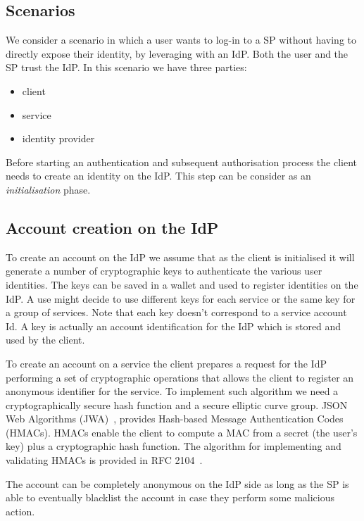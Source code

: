 \subsection{Scenarios}

We consider a scenario in which a user wants to log-in to a SP without having to directly expose their identity, by leveraging with an IdP. Both the user and the SP trust the IdP. In this scenario we have three parties:
\begin{itemize}
    \item client
    \item service
    \item identity provider
\end{itemize}

Before starting an authentication and subsequent authorisation process the client needs to create an identity on the IdP. This step can be consider as an \emph{initialisation} phase.

\subsection{Account creation on the IdP}

To create an account on the IdP we assume that as the client is initialised it will generate a number of cryptographic keys to authenticate the various user identities. The keys can be saved in a wallet and used to register identities on the IdP. A use might decide to use different keys for each service or the same key for a group of services. Note that each key doesn't correspond to a service account Id. A key is actually an account identification for the IdP which is stored and used by the client.

To create an account on a service the client prepares a request for the IdP performing a set of cryptographic operations that allows the client to register an anonymous identifier for the service. To implement such algorithm we need a
cryptographically secure hash function and a secure elliptic curve group. JSON Web Algorithms (JWA)~\cite{jones2015jwa}, provides Hash-based Message Authentication Codes (HMACs). HMACs enable the client to compute a MAC from a secret (the user's key) plus a cryptographic hash function. The algorithm for implementing and validating HMACs is provided in RFC 2104~\cite{krawczyk1997rfc}.

The account can be completely anonymous on the IdP side as long as the SP is able to eventually blacklist the account in case they perform some malicious action.
 
